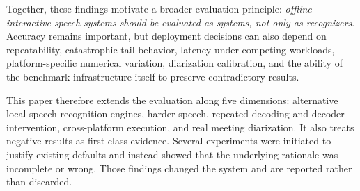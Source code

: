 Together, these findings motivate a broader evaluation principle: \emph{offline interactive
speech systems should be evaluated as systems, not only as recognizers}. Accuracy remains
important, but deployment decisions can also depend on repeatability, catastrophic tail
behavior, latency under competing workloads, platform-specific numerical variation,
diarization calibration, and the ability of the benchmark infrastructure itself to preserve
contradictory results.

This paper therefore extends the \YazSes{} evaluation along five dimensions: alternative local
speech-recognition engines, harder speech, repeated decoding and decoder intervention,
cross-platform execution, and real meeting diarization. It also treats negative results as
first-class evidence. Several experiments were initiated to justify existing defaults and
instead showed that the underlying rationale was incomplete or wrong. Those findings changed the
system and are reported rather than discarded.